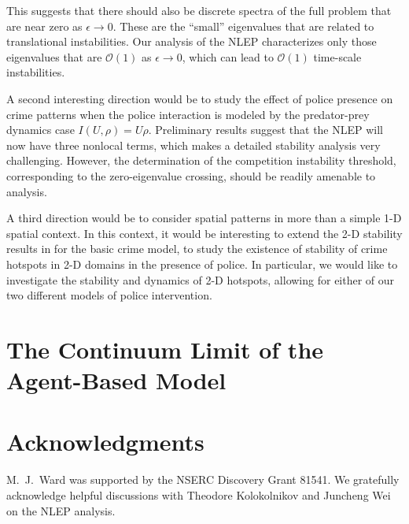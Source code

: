 \documentclass{article}%
\begin{document}
This suggests that there should also be discrete spectra of the full
problem that are near zero as $\epsilon\to 0$. These are the ``small''
eigenvalues that are related to translational instabilities. Our
analysis of the NLEP characterizes only those eigenvalues that are
${\mathcal O}(1)$ as $\epsilon\to 0$, which can lead to ${\mathcal
  O}(1)$ time-scale instabilities.

A second interesting direction would be to study the effect of police
presence on crime patterns when the police interaction is modeled by
the predator-prey dynamics case $I(U,\rho)=U\rho$. Preliminary results
suggest that the NLEP will now have three nonlocal terms, which makes
a detailed stability analysis very challenging. However, the
determination of the competition instability threshold, corresponding
to the zero-eigenvalue crossing, should be readily amenable to
analysis.

A third direction would be to consider spatial patterns in more than a
simple 1-D spatial context. In this context, it would be interesting
to extend the 2-D stability results in \cite{kww_crime} for the basic
crime model, to study the existence of stability of crime hotspots in
2-D domains in the presence of police. In particular, we would like to
investigate the stability and dynamics of 2-D hotspots, allowing for
either of our two different models of police intervention.

\appendix

\section{The Continuum Limit of the Agent-Based Model} 

\section*{Acknowledgments}
M.~J.~Ward was supported by the NSERC Discovery Grant 81541. We gratefully
acknowledge helpful discussions with Theodore Kolokolnikov and Juncheng
Wei on the NLEP analysis.
\end{document}
